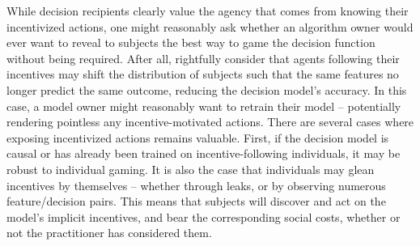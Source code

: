 While decision recipients clearly value the agency that comes from knowing their incentivized actions, one might reasonably ask whether an algorithm owner would ever want to reveal to subjects the best way to game the decision function without being required. After all, \citet{hardt2016strategic} rightfully consider that agents following their incentives may shift the distribution of subjects such that the same features no longer predict the same outcome, reducing the decision model's accuracy. In this case, a model owner might reasonably want to retrain their model -- potentially rendering pointless any incentive-motivated actions. 
There are several cases where exposing incentivized actions remains valuable. First, if the decision model is causal or has already been trained on incentive-following individuals, it may be robust to individual gaming. It is also the case that individuals may glean incentives by themselves -- whether through leaks, or by observing numerous feature/decision pairs. This means that subjects will discover and act on the model's implicit incentives, and bear the corresponding social costs, whether or not the practitioner has considered them.


